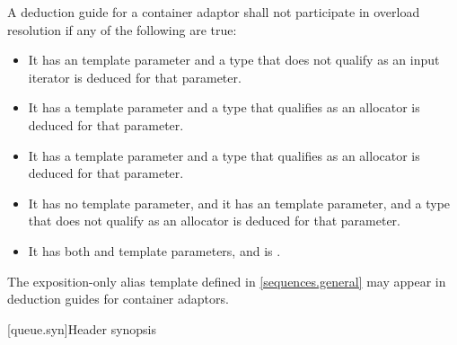 \pnum
A deduction guide for a container adaptor shall not participate in overload resolution if any of the following are true:
\begin{itemize}
\item It has an  template parameter and a type that does not qualify as an input iterator is deduced for that parameter.
\item It has a  template parameter and a type that qualifies as an allocator is deduced for that parameter.
\item It has a  template parameter and a type that qualifies as an allocator is deduced for that parameter.
\item It has no  template parameter, and it has an  template parameter, and a type that does not qualify as an allocator is deduced for that parameter.
\item It has both  and  template parameters, and  is .
\end{itemize}

\pnum
The exposition-only alias template 
defined in \ref{sequences.general}
may appear in deduction guides for container adaptors.

[queue.syn]{Header  synopsis}

